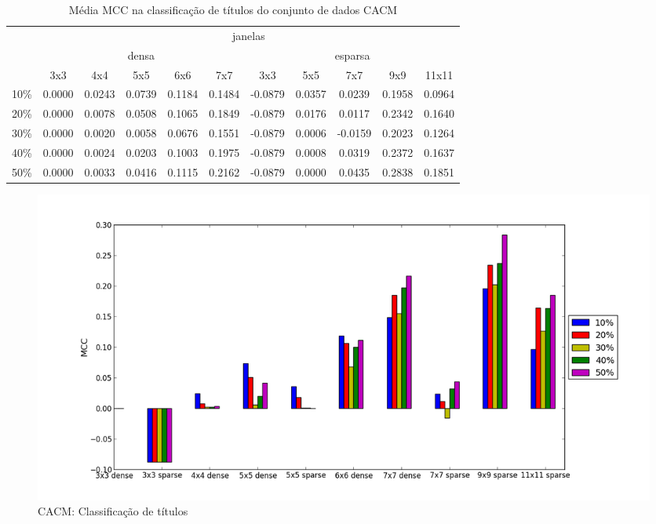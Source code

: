 \documentclass[a4paper,11pt]{article}
\begin{document}
  \begin{center}
    \begin{table}[p]
      \caption{Média MCC na classificação de títulos do conjunto de dados CACM}
      \begin{tabular}{ l | c c c c c || c c c c c | }
        \cline{2-11}
        & \multicolumn{10}{|c|}{janelas} \\
        \cline{2-11}
        & \multicolumn{5}{c||}{densa} & \multicolumn{5}{c|}{esparsa} \\
        \cline{2-11}
        & 3x3 & 4x4 & 5x5 & 6x6 & 7x7 & 3x3 & 5x5 & 7x7 & 9x9 & 11x11 \\
        \hline
        \multicolumn{1}{|l|}{10\%}& 0.0000& 0.0243& 0.0739& 0.1184& 0.1484& -0.0879& 0.0357& 0.0239& 0.1958& 0.0964\\
        \multicolumn{1}{|l|}{20\%}& 0.0000& 0.0078& 0.0508& 0.1065& 0.1849& -0.0879& 0.0176& 0.0117& 0.2342& 0.1640\\
        \multicolumn{1}{|l|}{30\%}& 0.0000& 0.0020& 0.0058& 0.0676& 0.1551& -0.0879& 0.0006& -0.0159& 0.2023& 0.1264\\
        \multicolumn{1}{|l|}{40\%}& 0.0000& 0.0024& 0.0203& 0.1003& 0.1975& -0.0879& 0.0008& 0.0319& 0.2372& 0.1637\\
        \multicolumn{1}{|l|}{50\%}& 0.0000& 0.0033& 0.0416& 0.1115& 0.2162& -0.0879& 0.0000& 0.0435& 0.2838& 0.1851\\
        \hline  
      \end{tabular}
    \end{table}
  \end{center}

  \begin{figure}[p]
    \centerline{\includegraphics[width=1.2\textwidth]{assets/experiment_charts/cacm_TextRegion_heading_mcc.png}}
    \caption{CACM: Classificação de títulos}
    \label{fig:cacm_TextRegion_heading_mcc}
  \end{figure}
\end{document}
